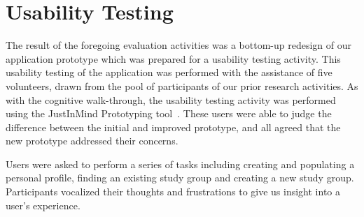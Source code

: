 \documentclass{sigchi-ext}
\begin{document}
\section{Usability Testing}

The result of the foregoing evaluation activities was a bottom-up redesign of
our application prototype which was prepared for a usability testing activity.
This usability testing of the application was performed with the assistance of
five volunteers, drawn from the pool of participants of our prior research
activities. As with the cognitive walk-through, the usability testing activity
was performed using the JustInMind Prototyping tool~\cite{justinmind}.  These
users were able to judge the difference between the initial and improved
prototype, and all agreed that the new prototype addressed their concerns.

Users were asked to perform a series of tasks including creating and populating
a personal profile, finding an existing study group and creating a new study
group. Participants vocalized their thoughts and frustrations to give us
insight into a user's experience.


\end{document}
